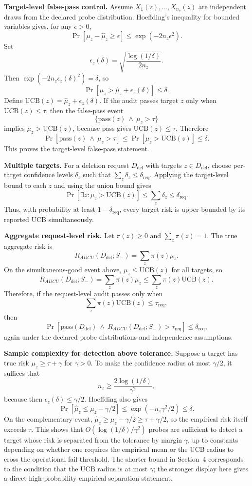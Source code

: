 \documentclass[10pt,journal,compsoc]{IEEEtran}
\newcommand{\method}{ADCU}
\begin{document}
\textbf{Target-level false-pass control.}
Assume $X_1(z),\ldots,X_{n_z}(z)$ are independent draws from the declared probe distribution. Hoeffding's inequality for bounded variables gives, for any $\epsilon>0$,
\[
\Pr[\mu_z-\hat\mu_z\geq \epsilon]\leq \exp(-2n_z\epsilon^2).
\]
Set
\[
\epsilon_z(\delta)=\sqrt{\frac{\log(1/\delta)}{2n_z}}.
\]
Then $\exp(-2n_z\epsilon_z(\delta)^2)=\delta$, so
\[
\Pr[\mu_z>\hat\mu_z+\epsilon_z(\delta)]\leq\delta.
\]
Define $\mathrm{UCB}(z)=\hat\mu_z+\epsilon_z(\delta)$. If the audit passes target $z$ only when $\mathrm{UCB}(z)\leq\tau$, then the false-pass event
\[
\{\mathrm{pass}(z)\ \wedge\ \mu_z>\tau\}
\]
implies $\mu_z>\mathrm{UCB}(z)$, because pass gives $\mathrm{UCB}(z)\leq\tau$. Therefore
\[
\Pr[\mathrm{pass}(z)\ \wedge\ \mu_z>\tau]
\leq
\Pr[\mu_z>\mathrm{UCB}(z)]
\leq \delta.
\]
This proves the target-level false-pass statement.

\textbf{Multiple targets.}
For a deletion request $D_{\mathrm{del}}$ with targets $z\in D_{\mathrm{del}}$, choose per-target confidence levels $\delta_z$ such that $\sum_z\delta_z\leq\delta_{\mathrm{req}}$. Applying the target-level bound to each $z$ and using the union bound gives
\[
\Pr[\exists z:\mu_z>\mathrm{UCB}(z)]\leq \sum_z\delta_z\leq\delta_{\mathrm{req}}.
\]
Thus, with probability at least $1-\delta_{\mathrm{req}}$, every target risk is upper-bounded by its reported UCB simultaneously.

\textbf{Aggregate request-level risk.}
Let $\pi(z)\geq0$ and $\sum_z\pi(z)=1$. The true aggregate risk is
\[
R_{\method}(D_{\mathrm{del}};S_-)=\sum_z \pi(z)\mu_z.
\]
On the simultaneous-good event above, $\mu_z\leq \mathrm{UCB}(z)$ for all targets, so
\[
R_{\method}(D_{\mathrm{del}};S_-)
=\sum_z\pi(z)\mu_z
\leq
\sum_z\pi(z)\mathrm{UCB}(z).
\]
Therefore, if the request-level audit passes only when
\[
\sum_z\pi(z)\mathrm{UCB}(z)\leq\tau_{\mathrm{req}},
\]
then
\[
\Pr[\mathrm{pass}(D_{\mathrm{del}})\ \wedge\ R_{\method}(D_{\mathrm{del}};S_-)>\tau_{\mathrm{req}}]
\leq \delta_{\mathrm{req}},
\]
again under the declared probe distributions and independence assumptions.

\textbf{Sample complexity for detection above tolerance.}
Suppose a target has true risk $\mu_z\geq\tau+\gamma$ for $\gamma>0$. To make the confidence radius at most $\gamma/2$, it suffices that
\[
n_z\geq \frac{2\log(1/\delta)}{\gamma^2},
\]
because then $\epsilon_z(\delta)\leq \gamma/2$. Hoeffding also gives
\[
\Pr[\hat\mu_z \leq \mu_z-\gamma/2]\leq \exp(-n_z\gamma^2/2)\leq\delta.
\]
On the complementary event, $\hat\mu_z\geq \mu_z-\gamma/2\geq\tau+\gamma/2$, so the empirical risk itself exceeds $\tau$. This shows that $O(\log(1/\delta)/\gamma^2)$ probes are sufficient to detect a target whose risk is separated from the tolerance by margin $\gamma$, up to constants depending on whether one requires the empirical mean or the UCB radius to cross the operational fail threshold. The shorter bound in Section~4 corresponds to the condition that the UCB radius is at most $\gamma$; the stronger display here gives a direct high-probability empirical separation statement.
\end{document}
